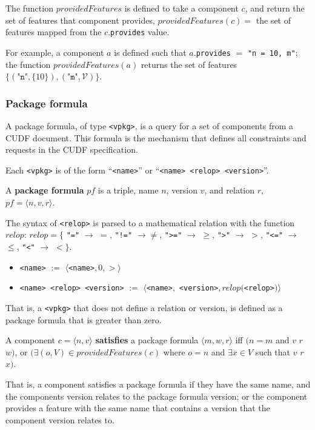 \begin{defs}
The function $providedFeatures$ is defined to take a component $c$, and return the set of features that component provides,
$providedFeatures(c) =$ the set of features mapped from the $c$.\texttt{provides} value.
\end{defs}

For example, a component $a$ is defined such that $a.$\texttt{provides} $=$ \texttt{"n = 10, m"};
the function $providedFeatures(a)$ returns the set of features $\{( \texttt{"n"},\{10\} ), ( \texttt{"m"},\mathcal{V})\}$.

\subsubsection{Package formula}
A package formula, of type \texttt{<vpkg>}, is a query for a set of components from a CUDF document.
This formula is the mechanism that defines all constraints and requests in the CUDF specification.

Each \texttt{<vpkg>} is of the form ``\texttt{<name>}'' or  ``\texttt{<name> <relop> <version>}''.
\begin{defs}
A \textbf{package formula} $pf$ is a triple, name $n$, version $v$, and relation $r$, $pf = \langle n, v , r \rangle$.
\end{defs}

The syntax of \verb+<relop>+ is parsed to a mathematical relation with the function $relop$:  
$relop = \{$ \verb+"="+ $\rightarrow$ $=$, \verb+"!="+ $\rightarrow \not =$, 
\verb+">="+ $\rightarrow$ $\geq$, \verb+">"+ $\rightarrow$ $>$, \verb+"<="+ $\rightarrow$ $\leq$, \verb+"<"+ $\rightarrow$ $<$$\}$.

\begin{itemize}
  \item \texttt{<name>} $:=$ $\langle $\texttt{<name>}$, 0 , > \rangle$
  \item \texttt{<name> <relop> <version>} $:=$ $\langle $\texttt{<name>}$,$ \texttt{<version>}$, relop($\texttt{<relop>}$) \rangle$
\end{itemize}
That is, a \texttt{<vpkg>} that does not define a relation or version, is defined as a package formula that is greater than zero.

\begin{defs}
A component $c = \langle n,v \rangle$ \textbf{satisfies} a package formula $\langle m,w,r\rangle$ iff
$(n = m$ and $v$ $r$ $w)$, or $(\exists (o,V) \in providedFeatures(c)$ where $o = n$ and $\exists x \in V$ such that $v$ $r$ $x)$. 
\end{defs}
That is, a component satisfies a package formula if they have the same name, and the components version relates to the package formula version;
or the component provides a feature with the same name that contains a version that the component version relates to.

